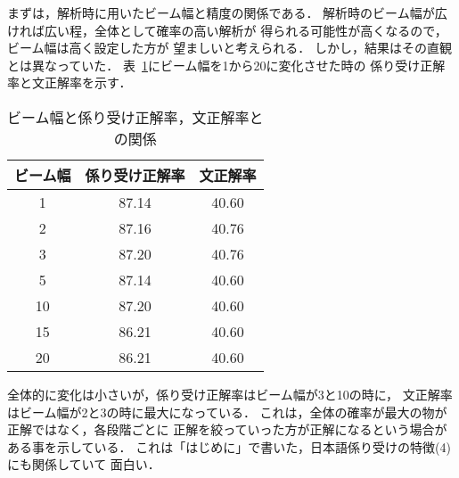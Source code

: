 まずは，解析時に用いたビーム幅と精度の関係である．
解析時のビーム幅が広ければ広い程，全体として確率の高い解析が
得られる可能性が高くなるので，ビーム幅は高く設定した方が
望ましいと考えられる．
しかし，結果はその直観とは異なっていた．
表~\ref{BeamAndAccuracy}にビーム幅を1から20に変化させた時の
係り受け正解率と文正解率を示す．
\begin{table}[tbh]
\caption{ビーム幅と係り受け正解率，文正解率との関係}
\label{BeamAndAccuracy} 
\begin{center}
\begin{tabular}{|c||c|c|}
\hline
ビーム幅    &  係り受け正解率 & 文正解率 \\
\hline
1           &    87.14        &  40.60  \\
2           &    87.16        &  40.76  \\
3           &    87.20        &  40.76  \\
5           &    87.14        &  40.60  \\
10          &    87.20        &  40.60  \\
15          &    86.21        &  40.60  \\
20          &    86.21        &  40.60  \\
\hline
\end{tabular}
\end{center}
\end{table}
全体的に変化は小さいが，係り受け正解率はビーム幅が3と10の時に，
文正解率はビーム幅が2と3の時に最大になっている．
これは，全体の確率が最大の物が正解ではなく，各段階ごとに
正解を絞っていった方が正解になるという場合がある事を示している．
これは「はじめに」で書いた，日本語係り受けの特徴(4)にも関係していて
面白い．

